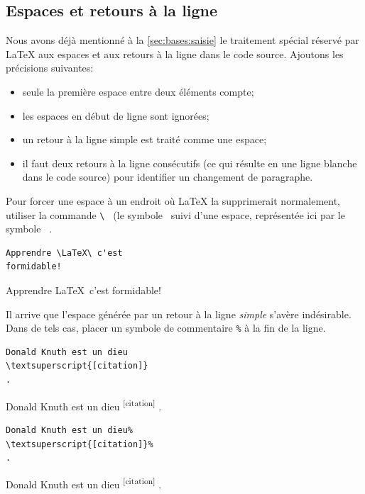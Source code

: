 \subsection{Espaces et retours à la ligne}
\label{sec:bases:caracteres:espaces}

Nous avons déjà mentionné à la \autoref{sec:bases:saisie} le
traitement spécial réservé par {\LaTeX} aux espaces et aux retours à
la ligne dans le code source. Ajoutons les précisions suivantes:
\begin{itemize}
\item seule la première espace entre deux éléments compte;
\item les espaces en début de ligne sont ignorées;
\item un retour à la ligne simple est traité comme une espace;
\item il faut deux retours à la ligne consécutifs (ce qui résulte en
  une ligne blanche dans le code source) pour identifier un changement
  de paragraphe.
\end{itemize}

Pour forcer une espace à un endroit où {\LaTeX} la supprimerait
normalement, utiliser la commande \verb*=\ = (le symbole \bs\ suivi
d'une espace, représentée ici par le symbole \verb*| |.
\begin{demo}
  \begin{texample}
\begin{lstlisting}
Apprendre \LaTeX\ c'est
formidable!
\end{lstlisting}
    \producing
    Apprendre \LaTeX\ c'est
    formidable!
  \end{texample}
\end{demo}

Il arrive que l'espace générée par un retour à la ligne \emph{simple}
s'avère indésirable. Dans de tels cas, placer un symbole de
commentaire \verb=%= à la fin de la ligne.
\begin{demo}
  \begin{texample}
\begin{lstlisting}
Donald Knuth est un dieu
\textsuperscript{[citation]}
.
\end{lstlisting}
    \producing
    Donald Knuth est un dieu
    \textsuperscript{[citation]}
    .
  \end{texample}
  \begin{texample}
\begin{lstlisting}
Donald Knuth est un dieu%
\textsuperscript{[citation]}%
.
\end{lstlisting}
    \producing
    Donald Knuth est un dieu%
    \textsuperscript{[citation]}%
    .
  \end{texample}
\end{demo}


